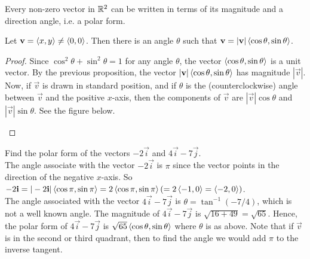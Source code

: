 \documentclass[handout]{ximera}
\begin{document}
Every non-zero vector in $\mathbb R^2$ can be written in terms of its magnitude and a direction angle, i.e. a polar form.

\begin{proposition}
Let $\mathbf{v} = \left\langle x,y\right\rangle \neq \left\langle 0,0\right\rangle$.  Then there is an angle $\theta$ such that $\mathbf{v} = |\mathbf{v}| \left\langle \cos \theta, \sin \theta\right\rangle$.
\begin{proof}
Since $\cos^2\theta + \sin^2\theta = 1$ for any angle $\theta$, the vector $\left\langle \cos \theta, \sin \theta\right\rangle$ is a unit vector.
By the previous proposition, the vector $|\mathbf{v}| \left\langle \cos \theta, \sin \theta\right\rangle$ has magnitude $|\vec{v}|$. 
Now, if $\vec{v}$ is drawn in standard position, and if $\theta$ is the (counterclockwise) angle between $\vec{v}$ and the positive $x$-axis, 
then the components of $\vec{v}$ are $|\vec{v}|\cos \theta$ and $|\vec{v}|\sin \theta$.  See the figure below.


\begin{image}
\end{image}


\end{proof}
\end{proposition}

\begin{example}[Example 4]
Find the polar form of the vectors $-2\vec{i}$ and $4\vec{i}-7\vec{j}$.\\
The angle associate with the vector $-2\vec{i}$ is $\pi$ since the vector points in the direction of the negative $x$-axis.
So $-2\mathbf{i} = |-2\mathbf{i}| \left\langle \cos \pi, \sin \pi\right\rangle = 2\left\langle \cos \pi, \sin \pi\right\rangle (= 2\left\langle -1, 0\right\rangle = \left\langle -2, 0\right\rangle)$.\\
The angle associated with the vector $4\vec{i}-7\vec{j}$ is $\theta = \tan^{-1}(-7/4)$, which is not a well known angle.
The magnitude of $4\vec{i}-7\vec{j}$ is $\sqrt{16 +49} = \sqrt{65}$.  Hence, the polar form of $4\vec{i}-7\vec{j}$ is
$\sqrt{65}\left\langle \cos \theta, \sin\theta\right\rangle$ where $\theta$ is as above. Note that if $\vec{v}$ is in the second or third quadrant, then 
to find the angle we would add $\pi$ to the inverse tangent.
\end{example}
\end{document}
